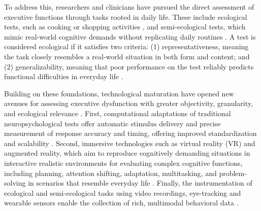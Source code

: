 



To address this, researchers and clinicians have pursued the direct assessment of executive functions through tasks rooted in daily life. These include ecological tests, such as cooking or shopping activities \cite{Howieson2019, SHALLICE1991, Rand2009}, and semi-ecological tests, which mimic real-world cognitive demands without replicating daily routines \cite{Wilson1998, Cardoso2015,  Chevignard2008, Campos2023}. A test is considered ecological if it satisfies two criteria: (1) representativeness, meaning the task closely resembles a real-world situation in both form and content; and (2) generalizability, meaning that poor performance on the test reliably predicts functional difficulties in everyday life \cite{afdd1ed6d28448bb8c236ad8c5995a56}.

Building on these foundations, technological maturation have opened new avenues for assessing executive dysfunction with greater objectivity, granularity, and ecological relevance \cite{Bavaresco2022}. First, computational adaptations of traditional neuropsychological tests offer automatic stimulus delivery and precise measurement of response accuracy and timing, offering improved standardization and scalability \cite{JOHNSON2008, Camilleri2021}. Second, immersive technologies such as virtual reality (VR) and augmented reality, which aim to reproduce cognitively demanding situations in interactive realistic environments for evaluating complex cognitive functions, including planning, attention shifting, adaptation, multitasking, and problem-solving in scenarios that resemble everyday life \cite{Castelnuovo2003, Nolin2016, Parsons2018, LANIER201970, Realdon2019, Kourtesis2020, Borgnis2021, Borgnis2023}. Finally, the instrumentation of ecological and semi-ecological tasks using video recordings, eye-tracking and wearable sensors enable the collection of rich, multimodal behavioral data \cite{Campos2023}. 

